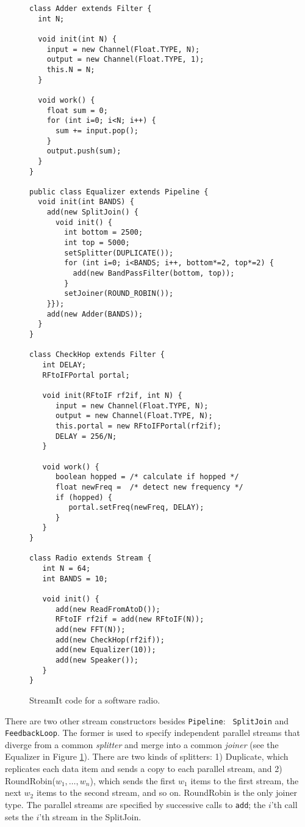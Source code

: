 \documentclass{sig-alternate}
\begin{document}
\begin{figure}
\vspace{-6pt}
\caption{Block diagram of a software radio.
\protect\label{fig:radiodiagram}}

\scriptsize
\begin{verbatim}
class Adder extends Filter {
  int N;

  void init(int N) {
    input = new Channel(Float.TYPE, N);
    output = new Channel(Float.TYPE, 1);
    this.N = N;
  }
  
  void work() {
    float sum = 0;
    for (int i=0; i<N; i++) {
      sum += input.pop();
    }
    output.push(sum);
  }
}

public class Equalizer extends Pipeline {
  void init(int BANDS) {
    add(new SplitJoin() {
      void init() {
        int bottom = 2500;
        int top = 5000;
        setSplitter(DUPLICATE());
        for (int i=0; i<BANDS; i++, bottom*=2, top*=2) {
          add(new BandPassFilter(bottom, top));
        }
        setJoiner(ROUND_ROBIN());
    }});
    add(new Adder(BANDS));
  }
}
  
class CheckHop extends Filter {
   int DELAY;
   RFtoIFPortal portal;

   void init(RFtoIF rf2if, int N) {
      input = new Channel(Float.TYPE, N);
      output = new Channel(Float.TYPE, N);
      this.portal = new RFtoIFPortal(rf2if);
      DELAY = 256/N;
   }

   void work() {
      boolean hopped = /* calculate if hopped */
      float newFreq =  /* detect new frequency */
      if (hopped) {
         portal.setFreq(newFreq, DELAY);
      }
   }
}

class Radio extends Stream {
   int N = 64;
   int BANDS = 10;

   void init() {
      add(new ReadFromAtoD());
      RFtoIF rf2if = add(new RFtoIF(N));
      add(new FFT(N));
      add(new CheckHop(rf2if));
      add(new Equalizer(10));
      add(new Speaker());
   }
}
\end{verbatim}
\vspace{-16pt}
\caption{StreamIt code for a software radio.
\protect\label{fig:radiocode}}
\end{figure}

There are two other stream constructors besides {\tt Pipeline}: {\tt
SplitJoin} and {\tt FeedbackLoop}.  The former is used to specify
independent parallel streams that diverge from a common {\it splitter}
and merge into a common {\it joiner} (see the Equalizer in Figure
\ref{fig:radiocode}).  There are two kinds of splitters: 1) Duplicate,
which replicates each data item and sends a copy to each parallel
stream, and 2) RoundRobin($w_1, \dots, w_n$), which sends the first
$w_1$ items to the first stream, the next $w_2$ items to the second
stream, and so on.  RoundRobin is the only joiner type.  The parallel
streams are specified by successive calls to {\tt add}; the $i$'th
call sets the $i$'th stream in the SplitJoin.
\end{document}
